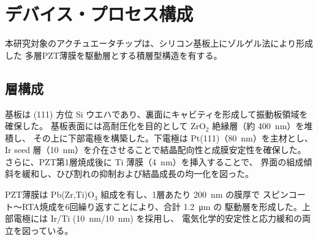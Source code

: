 \documentclass[conference]{IEEEtran}
\begin{document}
\section{デバイス・プロセス構成}
本研究対象のアクチュエータチップは、シリコン基板上にゾルゲル法により形成した
多層PZT薄膜を駆動層とする積層型構造を有する。

\subsection{層構成}
基板は (111) 方位 Si ウエハであり、裏面にキャビティを形成して振動板領域を確保した。
基板表面には高耐圧化を目的として ZrO$_2$ 絶縁層（約 \SI{400}{nm}）を堆積し、
その上に下部電極を構築した。下電極は Pt(111)（\SI{80}{nm}）を主材とし、
Ir seed 層（\SI{10}{nm}）を介在させることで結晶配向性と成膜安定性を確保した。
さらに、PZT第1層焼成後に Ti 薄膜（\SI{4}{nm}）を挿入することで、
界面の組成傾斜を緩和し、ひび割れの抑制および結晶成長の均一化を図った。

PZT薄膜は Pb(Zr,Ti)O$_3$ 組成を有し、1層あたり \SI{200}{nm} の膜厚で
スピンコート～RTA焼成を6回繰り返すことにより、合計 \SI{1.2}{\micro\metre} の
駆動層を形成した。上部電極には Ir/Ti (\SI{10}{nm}/\SI{10}{nm}) を採用し、
電気化学的安定性と応力緩和の両立を図っている。
\end{document}
